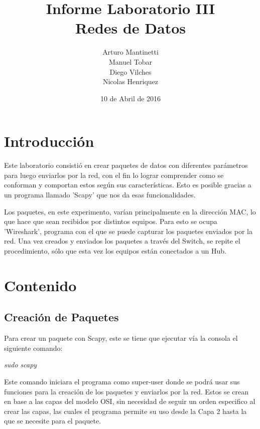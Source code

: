 ﻿\documentclass[spanish]{udpreport}
\title{Informe Laboratorio III \\ Redes de Datos}
\author{Arturo Mantinetti \\ Manuel Tobar \\ Diego Vilches \\ Nicolas Henriquez}
\date{10 de Abril de 2016} %
\begin{document}
\maketitle

\tableofcontents

\chapter{Introducción}

Este laboratorio consistió en crear paquetes de datos con diferentes parámetros para luego enviarlos por la red, con el fin lo lograr comprender como se conforman y comportan estos según sus características. Esto es posible gracias a un programa llamado 'Scapy' que nos da esas funcionalidades. 

Los paquetes, en este experimento, varían principalmente en la dirección MAC, lo que hace que sean recibidos por distintos equipos. Para esto se ocupa 'Wireshark', programa con el que se puede capturar los paquetes enviados por la red.  Una vez creados y enviados los paquetes a través del Switch, se repite el procedimiento, sólo que esta vez los equipos están conectados a un Hub. 



\chapter{Contenido}

\section{Creación de Paquetes}
Para crear un paquete con Scapy, este se tiene que ejecutar vía la consola el siguiente comando:
\begin{center}
	\emph{sudo scapy}
\end{center}

Este comando iniciara el programa como super-user donde se podrá usar sus funciones para la creación de los paquetes y enviarlos por la red. Estos se crean en base a las capas del modelo OSI, sin necesidad de seguir un orden especifico al crear las capas, las cuales el programa permite su uso desde la Capa 2 hasta la que se necesite para el paquete.
\end{document}

